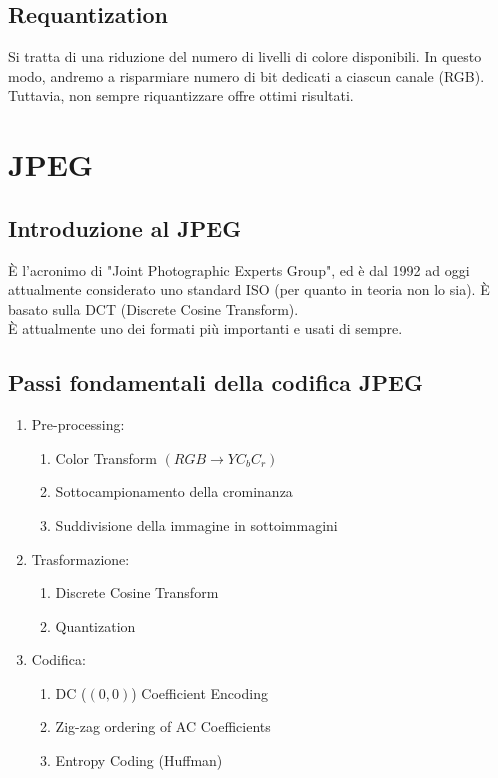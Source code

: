\documentclass{report}
\begin{document}
	\subsection{Requantization}
	Si tratta di una riduzione del numero di livelli di colore disponibili. In questo modo, andremo a risparmiare numero di bit dedicati a ciascun canale (RGB). Tuttavia, non sempre riquantizzare offre ottimi risultati.
		
	\newpage
		
	\section{JPEG}
	\subsection{Introduzione al JPEG}
	È l'acronimo di "Joint Photographic Experts Group", ed è dal 1992 ad oggi attualmente considerato uno standard ISO (per quanto in teoria non lo sia). È basato sulla DCT (Discrete Cosine Transform).\\
	È attualmente uno dei formati più importanti e usati di sempre. 
	\subsection{Passi fondamentali della codifica JPEG}
	\begin{enumerate}
		\item Pre-processing:
		      \begin{enumerate}
		      	\item Color Transform $(RGB \rightarrow YC_bC_r)$
		      	\item Sottocampionamento della crominanza
		      	\item Suddivisione della immagine in sottoimmagini
		      \end{enumerate}
		\item Trasformazione:
		      \begin{enumerate}
		      	\item Discrete Cosine Transform
		      	\item Quantization
		      \end{enumerate}
		      		      
		\item Codifica:
		      \begin{enumerate}
		      	\item DC ($(0,0)$) Coefficient Encoding
		      	\item Zig-zag ordering of AC Coefficients
		      	\item Entropy Coding (Huffman)
		      \end{enumerate}
	\end{enumerate}
		
\end{document}
